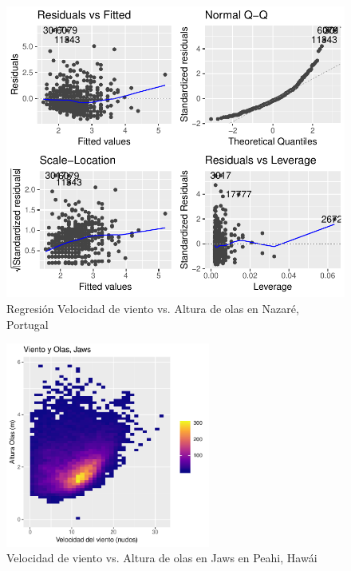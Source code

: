 \begin{figure}[H]
    \centering
    \includegraphics{./figures/nazare_500_lm.pdf}
    \caption{Regresión Velocidad de viento vs. Altura de olas en Nazaré, Portugal}
    \label{fig:wind_waves_nazare_fit_anal}
\end{figure}

\begin{figure}[H]
    \centering
    \includegraphics[width=0.6\textwidth]{./figures/jaws_bin2d.pdf}
    \caption{Velocidad de viento vs. Altura de olas en Jaws en Peahi, Hawái}
    \label{fig:wind_waves_jaws}
\end{figure}

